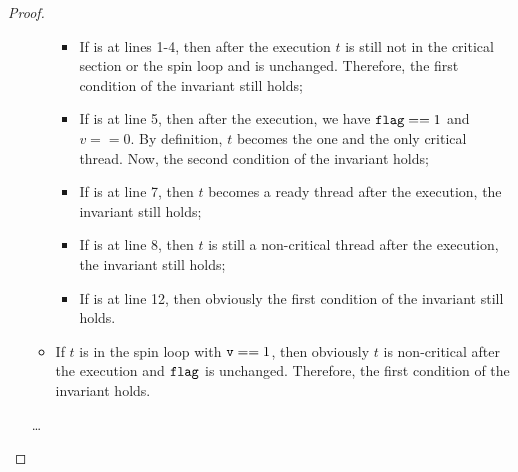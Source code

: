 \documentclass{article}[10pt]
\begin{document}
\begin{proof}
\begin{itemize}
\begin{itemize}
      \begin{itemize}
      \item If  is at lines 1-4, then after the execution $t$
        is still not in the critical section or the spin loop and
        \kflag is unchanged. Therefore, the first condition of the
        invariant still holds;

      \item If  is at line 5, then after the execution, we
        have $\text{\ttfamily flag} == 1$ and $v == 0$. By definition, $t$ becomes
        the one and the only critical thread. Now, the second
        condition of the invariant holds;

      \item If  is at line 7, then $t$ becomes a ready thread
        after the execution, the invariant still holds;

      \item If  is at line 8, then $t$ is still a non-critical
        thread after the execution, the invariant still holds;

      \item If  is at line 12, then obviously the first
        condition of the invariant still holds.

      \end{itemize}


    \item If $t$ is in the spin loop with $\text{\ttfamily v} == 1$, then obviously
      $t$ is non-critical after the execution and $\text{\ttfamily flag}$ is
      unchanged. Therefore, the first condition of the invariant
      holds.

    \end{itemize}
    

    \dots
  \end {itemize}
\end{proof}
\end{document}
